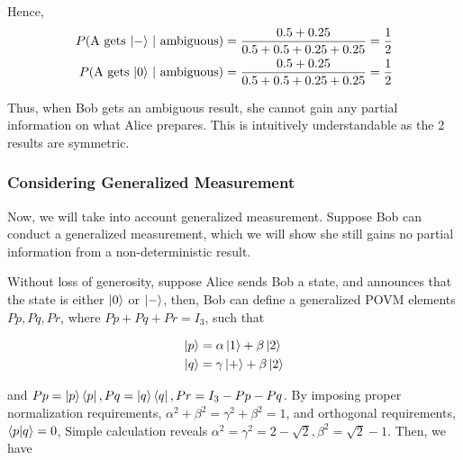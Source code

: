 \documentclass[%
 reprint,
superscriptaddress,
 amsmath,amssymb,
 aps,
]{revtex4-2}
\begin{document}
Hence, 
\begin{equation}
    \begin{split}
        P(\text{A gets $\ket{-}$ $|$ ambiguous})&=\frac{0.5+0.25}{0.5+0.5+0.25+0.25}=\frac{1}{2}\\
        P(\text{A gets $\ket{0}$ $|$ ambiguous})&=\frac{0.5+0.25}{0.5+0.5+0.25+0.25}=\frac{1}{2}\\
    \end{split}
\end{equation}

Thus, when Bob gets an ambiguous result, she cannot gain any partial information on what Alice prepares. This is intuitively understandable as the 2 results are symmetric. 

\subsubsection{Considering Generalized Measurement}
Now, we will take into account generalized measurement. Suppose Bob can conduct a generalized measurement, which we will show she still gains no partial information from a non-deterministic result.

Without loss of generosity, suppose Alice sends Bob a state, and announces that the state is either $\ket{0}$ or $\ket{-}$, then, Bob can define a generalized POVM elements $Pp, Pq, Pr$, where $Pp+Pq+Pr=I_3$, such that 

\begin{equation}
\begin{split}
    \ket{p}&=\alpha\ket{1}+\beta\ket{2}\\
    \ket{q}&=\gamma\ket{+}+\beta\ket{2}\\
\end{split}
\end{equation}

and $Pp=\ket{p}\bra{p}, Pq=\ket{q}\bra{q}, Pr=I_3-Pp-Pq$. By imposing proper normalization requirements, $\alpha^2+\beta^2=\gamma^2+\beta^2=1$, and orthogonal requirements, $\bra{p}\ket{q}=0$, Simple calculation reveals $\alpha^2=\gamma^2=2-\sqrt{2}, \beta^2=\sqrt{2}-1$. Then, we have
\end{document}

